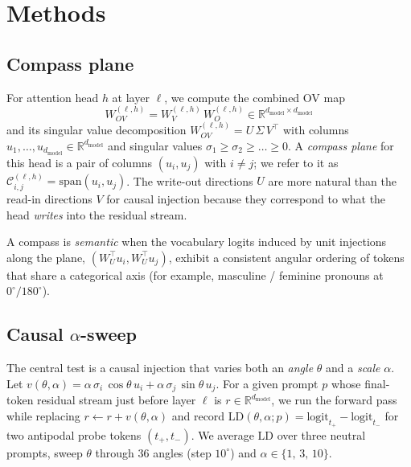 \section{Methods}
\label{sec:methods}

\subsection{Compass plane}
\label{sec:compass_plane}

For attention head $h$ at layer $\ell$, we compute the combined OV map
\begin{equation}
    W_{OV}^{(\ell,h)} = W_V^{(\ell,h)}\,W_O^{(\ell,h)}
    \in \mathbb{R}^{d_\text{model}\times d_\text{model}}
\end{equation}
and its singular value decomposition
$W_{OV}^{(\ell,h)} = U\,\Sigma\,V^\top$ with columns
$u_1,\dots,u_{d_\text{model}} \in \mathbb{R}^{d_\text{model}}$ and
singular values $\sigma_1 \geq \sigma_2 \geq \dots \geq 0$. A
\emph{compass plane} for this head is a pair of columns
$(u_i, u_j)$ with $i \neq j$; we refer to it as
$\mathcal{C}^{(\ell,h)}_{i,j} = \mathrm{span}(u_i, u_j)$.
The write-out directions $U$ are more natural than the read-in
directions $V$ for causal injection because they correspond to what
the head \emph{writes} into the residual stream.

A compass is \emph{semantic} when the vocabulary logits induced by unit
injections along the plane, $(W_U^\top u_i, W_U^\top u_j)$, exhibit a
consistent angular ordering of tokens that share a categorical axis (for
example, masculine / feminine pronouns at $0^\circ / 180^\circ$).

\subsection{Causal $\alpha$-sweep}
\label{sec:alpha_sweep}

The central test is a causal injection that varies both an \emph{angle}
$\theta$ and a \emph{scale} $\alpha$. Let
$v(\theta,\alpha) = \alpha\,\sigma_i\,\cos\theta\,u_i + \alpha\,\sigma_j\,\sin\theta\,u_j.$
For a given prompt $p$ whose final-token residual stream just before
layer $\ell$ is $r \in \mathbb{R}^{d_\text{model}}$, we run the forward
pass while replacing $r \gets r + v(\theta,\alpha)$ and record
$\mathrm{LD}(\theta,\alpha;p) = \mathrm{logit}_{t_{+}} - \mathrm{logit}_{t_{-}}$
for two antipodal probe tokens $(t_{+}, t_{-})$.
We average $\mathrm{LD}$ over three neutral prompts, sweep $\theta$ through
$36$ angles (step $10^\circ$) and $\alpha \in \{1,\,3,\,10\}$.

